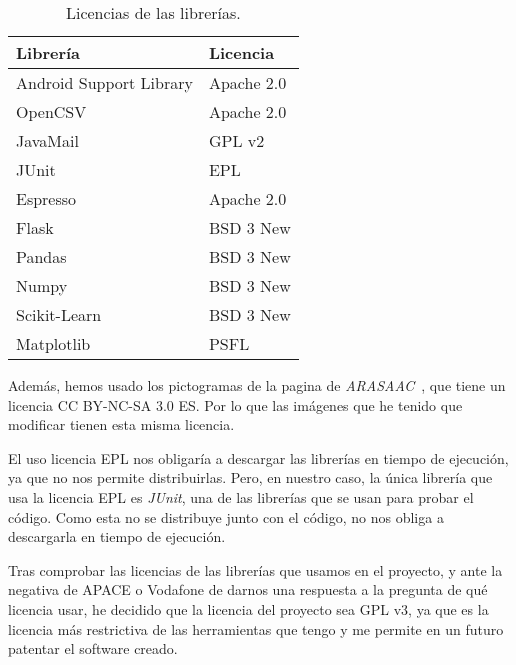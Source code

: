 \begin{table}[H]
	\centering
	\begin{tabular}{ll}
		\toprule
		\textbf{Librería}       & \textbf{Licencia} \\ \hline
		Android Support Library & Apache 2.0        \\
		OpenCSV                 & Apache 2.0        \\
		JavaMail                & GPL v2            \\
		JUnit                   & EPL               \\
		Espresso                & Apache 2.0        \\
		Flask                   & BSD 3 New              \\
		Pandas                  & BSD 3 New            \\
		Numpy                   & BSD 3 New           \\
		Scikit-Learn            & BSD 3 New   \\
		Matplotlib              & PSFL              \\ \bottomrule
	\end{tabular}
	\caption{Licencias de las librerías.}
\end{table}

Además, hemos usado los pictogramas de la pagina de \textit{ARASAAC}~\cite{arasaac}, que tiene un licencia CC BY-NC-SA 3.0 ES. Por lo que las imágenes que he tenido que modificar tienen esta misma licencia.

El uso licencia EPL nos obligaría a descargar las librerías en tiempo de ejecución, ya que no nos permite distribuirlas. Pero, en nuestro caso, la única librería que usa la licencia EPL es \textit{JUnit}, una de las librerías que se usan para probar el código. Como esta no se distribuye junto con el código, no nos obliga a descargarla en tiempo de ejecución.

Tras comprobar las licencias de las librerías que usamos en el proyecto, y ante la negativa de APACE o Vodafone de darnos una respuesta a la pregunta de qué licencia usar, he decidido que la licencia del proyecto sea GPL v3, ya que es la licencia más restrictiva de las herramientas que tengo y me permite en un futuro patentar el software creado.